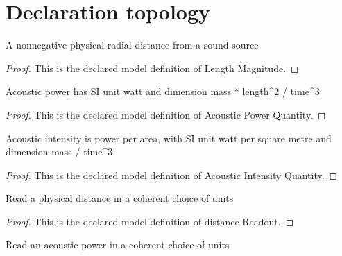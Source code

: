 \section{Declaration topology}
\begin{definition}
  \label{def:physics:phyx-mini-0317:phyxminiproblems-problemphyxmini0317-lengthmagnitude}
  A nonnegative physical radial distance from a sound source
\end{definition}
\begin{proof}
  This is the declared model definition of Length Magnitude.
\end{proof}
\begin{definition}
  \label{def:physics:phyx-mini-0317:phyxminiproblems-problemphyxmini0317-acousticpowerquantity}
  Acoustic power has SI unit watt and dimension mass * length\textasciicircum{}2 / time\textasciicircum{}3
\end{definition}
\begin{proof}
  This is the declared model definition of Acoustic Power Quantity.
\end{proof}
\begin{definition}
  \label{def:physics:phyx-mini-0317:phyxminiproblems-problemphyxmini0317-acousticintensityquantity}
  Acoustic intensity is power per area, with SI unit watt per square metre and dimension mass / time\textasciicircum{}3
\end{definition}
\begin{proof}
  This is the declared model definition of Acoustic Intensity Quantity.
\end{proof}
\begin{definition}
  \label{def:physics:phyx-mini-0317:phyxminiproblems-problemphyxmini0317-distancereadout}
  Read a physical distance in a coherent choice of units
\end{definition}
\begin{proof}
  This is the declared model definition of distance Readout.
\end{proof}
\begin{definition}
  \label{def:physics:phyx-mini-0317:phyxminiproblems-problemphyxmini0317-acousticpowerreadout}
  Read an acoustic power in a coherent choice of units
\end{definition}
